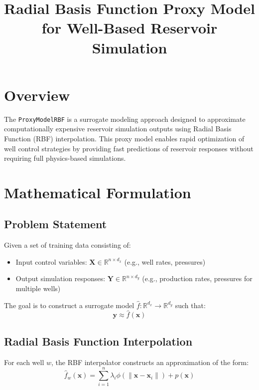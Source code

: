 \documentclass[11pt]{article}
\title{Radial Basis Function Proxy Model for Well-Based Reservoir Simulation}
\author{}
\date{}
\begin{document}
\maketitle

\section{Overview}

The \texttt{ProxyModelRBF} is a surrogate modeling approach designed to approximate computationally expensive reservoir simulation outputs using Radial Basis Function (RBF) interpolation. This proxy model enables rapid optimization of well control strategies by providing fast predictions of reservoir responses without requiring full physics-based simulations.

\section{Mathematical Formulation}

\subsection{Problem Statement}

Given a set of training data consisting of:
\begin{itemize}
    \item Input control variables: $\mathbf{X} \in \mathbb{R}^{n \times d_x}$ (e.g., well rates, pressures)
    \item Output simulation responses: $\mathbf{Y} \in \mathbb{R}^{n \times d_y}$ (e.g., production rates, pressures for multiple wells)
\end{itemize}

The goal is to construct a surrogate model $\hat{f}: \mathbb{R}^{d_x} \rightarrow \mathbb{R}^{d_y}$ such that:
\begin{equation}
\mathbf{y} \approx \hat{f}(\mathbf{x})
\end{equation}

\subsection{Radial Basis Function Interpolation}

For each well $w$, the RBF interpolator constructs an approximation of the form:
\begin{equation}
\hat{f}_w(\mathbf{x}) = \sum_{i=1}^{n} \lambda_i \phi(\|\mathbf{x} - \mathbf{x}_i\|) + p(\mathbf{x})
\end{equation}
\end{document}
